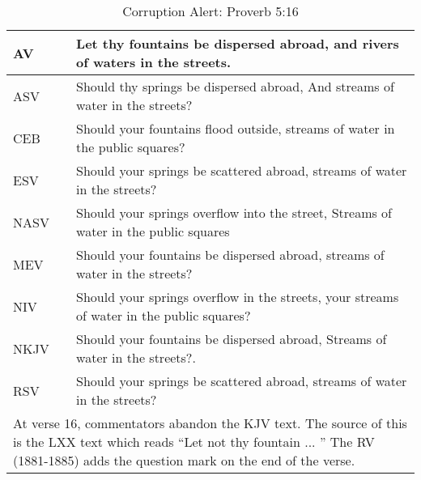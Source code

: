 
\newpage
\begin{center}

\begin{table}[ht]
\centering
\begin{tabular}{|p{.5in}|p{3.5in}|}
\hline

\textcolor[rgb]{0.00,0.00,1.00}{AV} & \textcolor[rgb]{0.00,0.00,1.00}{Let thy fountains be dispersed abroad, and rivers of waters in the streets.} \\ \hline \hline

ASV &  Should thy springs be dispersed abroad, And streams of water in the streets?\\ \hline 


CEB &  Should your fountains flood outside, streams of water in the public squares?\\ \hline

ESV & Should your springs be scattered abroad, streams of water in the streets? \\ \hline

NASV & Should your springs overflow into the street, Streams of water in the public squares\\ \hline

MEV & Should your fountains be dispersed abroad, streams of water in the streets?\\ \hline

NIV &  Should your springs overflow in the streets, your streams of water in the public squares? \\ \hline

NKJV & Should your fountains be dispersed abroad, Streams of water in the streets?.\\ \hline

RSV & Should your springs be scattered abroad, streams of water in the streets?\\ \hline \hline


\multicolumn{2}{|p{4.2in}|}{{\textcolor{jungle}{At verse 16, commentators abandon the KJV text.  The source of this is the
LXX text which reads ``Let not thy fountain ... '' The RV (1881-1885) adds the question mark on the end of the
verse. }}} \\ \hline

\end{tabular}
\caption[Corruption Alert: Proverb 5:16]{Corruption Alert: Proverb 5:16} \label{table:Corruption Proverb 5:16}
\end{table}

\end{center}


\newpage


